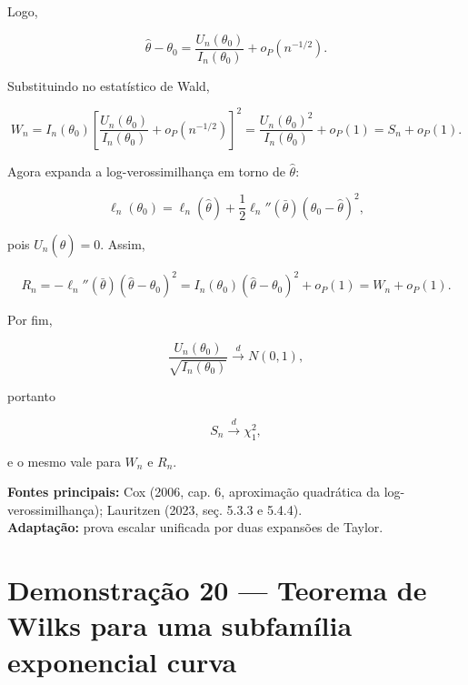\documentclass[
  letterpaper,
  DIV=11,
  numbers=noendperiod]{scrreprt}
\begin{document}
Logo,

\[
\widehat\theta-\theta_0
=
\frac{U_n(\theta_0)}{I_n(\theta_0)}+o_P(n^{-1/2}).
\]

Substituindo no estatístico de Wald,

\[
W_n
=
I_n(\theta_0)
\left[
\frac{U_n(\theta_0)}{I_n(\theta_0)}+o_P(n^{-1/2})
\right]^2
=
\frac{U_n(\theta_0)^2}{I_n(\theta_0)}+o_P(1)
=
S_n+o_P(1).
\]

Agora expanda a log-verossimilhança em torno de \(\widehat\theta\):

\[
\ell_n(\theta_0)
=
\ell_n(\widehat\theta)
+
\frac12\ell_n''(\bar\theta)(\theta_0-\widehat\theta)^2,
\]

pois \(U_n(\widehat\theta)=0\). Assim,

\[
R_n
=
-\ell_n''(\bar\theta)(\widehat\theta-\theta_0)^2
=
I_n(\theta_0)(\widehat\theta-\theta_0)^2+o_P(1)
=
W_n+o_P(1).
\]

Por fim,

\[
\frac{U_n(\theta_0)}{\sqrt{I_n(\theta_0)}}
\xrightarrow{d}N(0,1),
\]

portanto

\[
S_n\xrightarrow{d}\chi^2_1,
\]

e o mesmo vale para \(W_n\) e \(R_n\).

\begin{tcolorbox}[enhanced jigsaw, colback=white, leftrule=.75mm, colbacktitle=quarto-callout-note-color!10!white, breakable, titlerule=0mm, bottomtitle=1mm, title=\textcolor{quarto-callout-note-color}{\faInfo}\hspace{0.5em}{Fonte da demonstração}, colframe=quarto-callout-note-color-frame, toprule=.15mm, opacityback=0, bottomrule=.15mm, opacitybacktitle=0.6, arc=.35mm, toptitle=1mm, rightrule=.15mm, coltitle=black, left=2mm]

\textbf{Fontes principais:} Cox (2006, cap. 6, aproximação quadrática da
log-verossimilhança); Lauritzen (2023, seç. 5.3.3 e 5.4.4).\\
\textbf{Adaptação:} prova escalar unificada por duas expansões de
Taylor.

\end{tcolorbox}

\section*{Demonstração 20 --- Teorema de Wilks para uma subfamília
exponencial
curva}\label{demonstrauxe7uxe3o-20-teorema-de-wilks-para-uma-subfamuxedlia-exponencial-curva}
\end{document}
